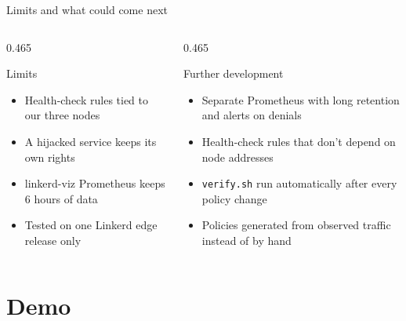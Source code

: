 \documentclass[9pt,aspectratio=169]{beamer}
\begin{document}
\begin{frame}{Limits and what could come next}
  \vfill
  \begin{columns}[T,onlytextwidth]
    \begin{column}{0.465\textwidth}
      \begin{alertblock}{Limits}
        \begin{itemize}\setlength{\itemsep}{9pt}
          \item Health-check rules tied to our three nodes
          \item A hijacked service keeps its own rights
          \item linkerd-viz Prometheus keeps 6 hours of data
          \item Tested on one Linkerd edge release only
        \end{itemize}
      \end{alertblock}
    \end{column}
    \begin{column}{0.465\textwidth}
      \begin{exampleblock}{Further development}
        \begin{itemize}\setlength{\itemsep}{9pt}
          \item Separate Prometheus with long retention and alerts on denials
          \item Health-check rules that don't depend on node addresses
          \item \texttt{verify.sh} run automatically after every policy change
          \item Policies generated from observed traffic instead of by hand
        \end{itemize}
      \end{exampleblock}
    \end{column}
  \end{columns}
  \vfill
\end{frame}

\section{Demo}
\end{document}

